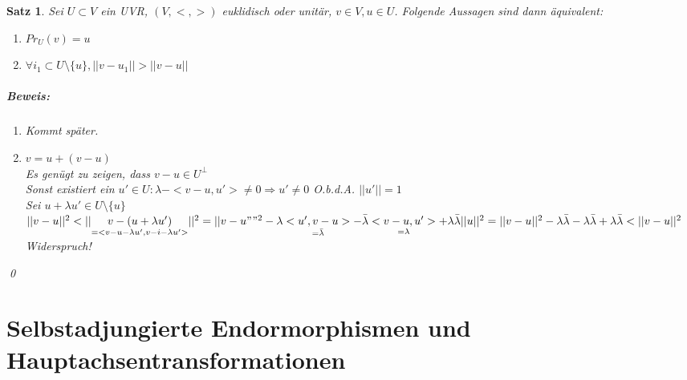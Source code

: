 \documentclass{report}
\newcommand{\lb}{\lambda}
\theoremstyle{customrem}
\theoremstyle{customdef}
\newtheorem{satz}[definition]{Satz}
\renewenvironment{proof}{\paragraph{Beweis: }}{\qed}
\theoremstyle{customenv}
\begin{document}
\begin{satz}
  Sei \(U \subset V\) ein UVR, \((V, <,>)\) euklidisch oder unit\"ar, 
  \(v \in V, u \in U\). Folgende Aussagen sind dann \"aquivalent:
  \begin{enumerate}
    \item {
      \(Pr_U(v) = u\)
    }
  \item {
      \(\forall i_1 \subset U\setminus \{u\}, ||v - u_1|| > ||v - u||\)
    }
  \end{enumerate}
  \begin{proof}
  \begin{enumerate}
    \item {
        Kommt sp\"ater.
    }
  \item [b.) \(\Rightarrow\) a.)]{
      \(v = u + (v - u)\)\\
      Es gen\"ugt zu zeigen, dass \(v - u \in U^\bot\)\\
      Sonst existiert ein \(u' \in U : \lb - <v - u, u'> \neq 0
      \Rightarrow u' \neq 0\) O.b.d.A. \(||u'|| = 1\)\\
      Sei \(u + \lb u' \in U \setminus \{u\}\)\\
      \(||v - u||^2 < ||\underset{=<v - u - \lb u', v - i - \lb u'>}{v - (u + \lb u')}||^2\\
      = ||v - u""^2 - \lb \underset{=\bar\lb}{<u', v - u>} - \bar \lb \underset{=\lb}{<v - u, u'>} + \lb \bar\lb ||u||^2
      = ||v - u||^2 - \lb \bar\lb  - \lb \bar \lb + \lb \bar \lb < ||v - u||^2
      \) Widerspruch!
    }
  \end{enumerate}
  \end{proof}
\end{satz}

\chapter{Selbstadjungierte Endormorphismen und Hauptachsentransformationen}
\end{document}
